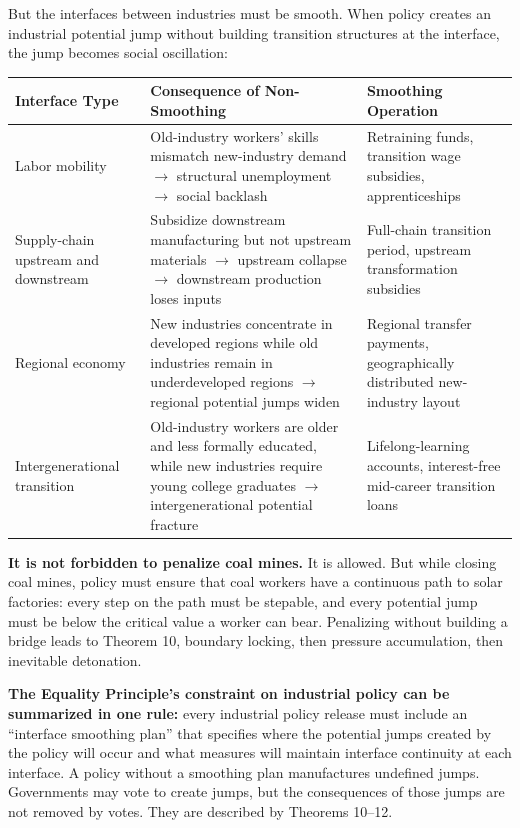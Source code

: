 \documentclass[12pt,a4paper]{article}
\theoremstyle{remark}
\begin{document}
But the interfaces between industries must be smooth. When policy creates an industrial potential jump without building transition structures at the interface, the jump becomes social oscillation:

\begin{center}
\begin{tabular}{p{2.5cm} p{6cm} p{6cm}}
\toprule
\textbf{Interface Type} & \textbf{Consequence of Non-Smoothing} & \textbf{Smoothing Operation} \\
\midrule
Labor mobility & Old-industry workers' skills mismatch new-industry demand $\to$ structural unemployment $\to$ social backlash & Retraining funds, transition wage subsidies, apprenticeships \\
\hline
Supply-chain upstream and downstream & Subsidize downstream manufacturing but not upstream materials $\to$ upstream collapse $\to$ downstream production loses inputs & Full-chain transition period, upstream transformation subsidies \\
\hline
Regional economy & New industries concentrate in developed regions while old industries remain in underdeveloped regions $\to$ regional potential jumps widen & Regional transfer payments, geographically distributed new-industry layout \\
\hline
Intergenerational transition & Old-industry workers are older and less formally educated, while new industries require young college graduates $\to$ intergenerational potential fracture & Lifelong-learning accounts, interest-free mid-career transition loans \\
\bottomrule
\end{tabular}
\end{center}

\textbf{It is not forbidden to penalize coal mines.} It is allowed. But while closing coal mines, policy must ensure that coal workers have a continuous path to solar factories: every step on the path must be stepable, and every potential jump must be below the critical value a worker can bear. Penalizing without building a bridge leads to Theorem 10, boundary locking, then pressure accumulation, then inevitable detonation.

\textbf{The Equality Principle's constraint on industrial policy can be summarized in one rule:} every industrial policy release must include an ``interface smoothing plan'' that specifies where the potential jumps created by the policy will occur and what measures will maintain interface continuity at each interface. A policy without a smoothing plan manufactures undefined jumps. Governments may vote to create jumps, but the consequences of those jumps are not removed by votes. They are described by Theorems 10--12.
\end{document}
